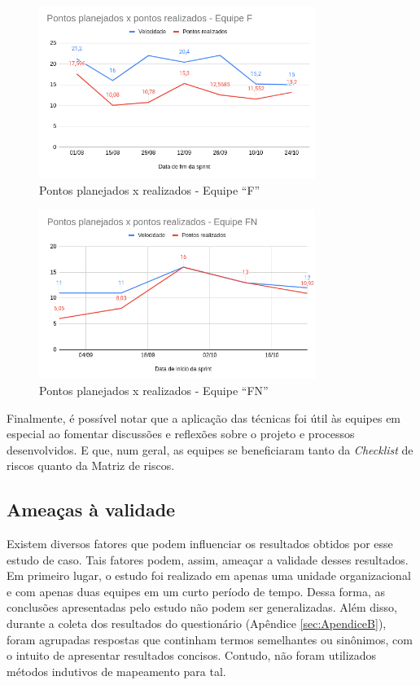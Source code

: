 \documentclass[
    12pt,       %
    openright,      %
    twoside,      %
    a4paper,      %
    english,      %
    french,       %
    spanish,      %
    brazil,       %
    ]{abntex2}
\begin{document}
\begin{figure}[H]
    \centering
    \includegraphics[width=0.8\textwidth]{src/tex/img/comp-founds.png}
    \caption{Pontos planejados x realizados - Equipe ``F''}
    \label{fig:comp_founds}
\end{figure}

\begin{figure}[H]
    \centering
    \includegraphics[width=0.8\textwidth]{src/tex/img/comp-fruit.png}
    \caption{Pontos planejados x realizados - Equipe ``FN''}
    \label{fig:comp_fruit}
\end{figure}

Finalmente, é possível notar que a aplicação das técnicas foi útil às equipes em especial ao fomentar discussões e reflexões sobre o projeto e processos desenvolvidos. E que, num geral, as equipes se beneficiaram tanto da \textit{Checklist} de riscos quanto da Matriz de riscos.


\subsection{Ameaças à validade}

Existem diversos fatores que podem influenciar os resultados obtidos por esse estudo de caso. Tais fatores podem, assim, ameaçar a validade desses resultados. Em primeiro lugar, o estudo foi realizado em apenas uma unidade organizacional e com apenas duas equipes em um curto período de tempo. Dessa forma, as conclusões apresentadas pelo estudo não podem ser generalizadas. Além disso, durante a coleta dos resultados do questionário (Apêndice \ref{sec:ApendiceB}), foram agrupadas respostas que continham termos semelhantes ou sinônimos, com o intuito de apresentar resultados concisos. Contudo, não foram utilizados métodos indutivos de mapeamento para tal.
\end{document}
